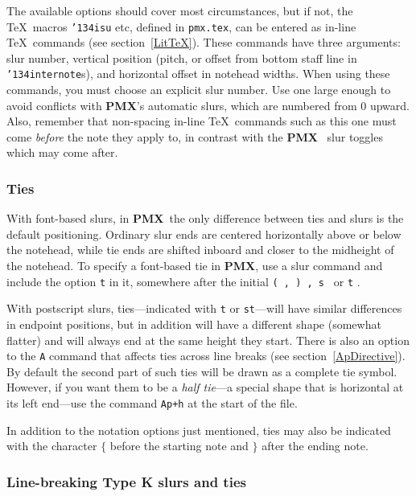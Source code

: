 \documentclass[11pt]{article}
\def\bs{{\tt\char'134}}
\newcommand\PMXX{\textbf{PMX}}
\newcommand\PMX{\PMXX~}
\def\newfrom{2.59}  %
\def\NEW#1{\ifdim#1 pt<\newfrom pt\else%
\marginpar{\fbox{#1}}\fi}
\begin{document}
The available options should cover most circumstances, but if not, 
the \TeX\ macros \bs{\tt isu} etc, defined in {\tt pmx.tex}, can be entered 
as in-line \TeX\ commands (see section~\ref{LitTeX}).  
These commands have three arguments: 
slur number, vertical position (pitch, or offset from bottom staff line in 
\bs{\tt internote}s), and horizontal offset in
notehead widths.  When using these commands, you must choose an explicit
slur number.  Use one large enough to avoid
conflicts with \PMXX 's automatic slurs, which are numbered from \NEW{2.4}
0 upward. 
Also, remember that non-spacing in-line \TeX\ commands such as this one must 
come {\it before} the note they apply to, in contrast with the \PMX 
slur toggles which may come after.  

\subsubsection{Ties}

With font-based slurs, in \PMX the only difference between ties and slurs
is the default positioning.
Ordinary slur ends are centered horizontally above or below the notehead, 
while tie ends are shifted inboard and closer to the midheight of the 
notehead.  To specify a font-based tie in \PMXX, use a slur command and 
include the option {\tt t} 
in it, somewhere after the initial {\tt ( , ) , s } or {\tt t} .

\NEW{2.4} With postscript slurs, ties---indicated with {\tt t} or
{\tt st}---will have similar differences
in endpoint positions,
but in addition will have a different shape (somewhat flatter) and will
always end at the same height they start. There is also an option to the
{\tt A} command that affects ties across line breaks 
(see section~\ref{ApDirective}). By default the 
second part of such ties will be drawn as a complete tie symbol.  However,
if you want them to be a {\it half tie}---a special shape that is horizontal
at its left end---use the command {\tt Ap+h} at the start of the file. 

In addition to the notation options just mentioned, ties may also be 
indicated with the character {\tt$\{$} before the starting note and {\tt$\}$} after
the ending note\NEW{2.6}.

\subsubsection{Line-breaking Type K slurs and ties} \NEW{2.5} \label{lbslurs}
\end{document}
